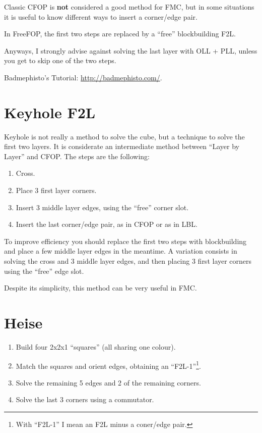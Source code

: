 \documentclass[11pt,a4paper]{book}
\begin{document}
Classic CFOP is \textbf{not} considered a good method for FMC, but in some situations it is useful to know different ways to insert a corner/edge pair.

In FreeFOP, the first two steps are replaced by a ``free'' blockbuilding F2L.

Anyways, I strongly advise against solving the last layer with OLL + PLL, unless you get to skip one of the two steps.

Badmephisto's Tutorial: \url{http://badmephisto.com/}.

\section{Keyhole F2L}

Keyhole is not really a method to solve the cube, but a technique to solve the first two layers. It is considerate an intermediate method between “Layer by Layer” and CFOP. The steps are the following:
\begin{enumerate}
\item Cross.
\item Place 3 first layer corners.
\item Insert 3 middle layer edges, using the ``free'' corner slot.
\item Insert the last corner/edge pair, as in CFOP or as in LBL.
\end{enumerate}

To improve efficiency you should replace the first two steps with blockbuilding and place a few middle layer edges in the meantime. A variation consists in solving the cross and 3 middle layer edges, and then placing 3 first layer corners using the ``free'' edge slot.

Despite its simplicity, this method can be very useful in FMC.

\section{Heise}
\begin{enumerate}
\item Build four 2x2x1 ``squares'' (all sharing one colour).
\item Match the squares and orient edges, obtaining an ``F2L-1''\footnote{With ``F2L-1'' I mean an F2L minus a coner/edge pair.}.
\item Solve the remaining 5 edges and 2 of the remaining corners.
\item Solve the last 3 corners using a commutator.
\end{enumerate}
\end{document}
